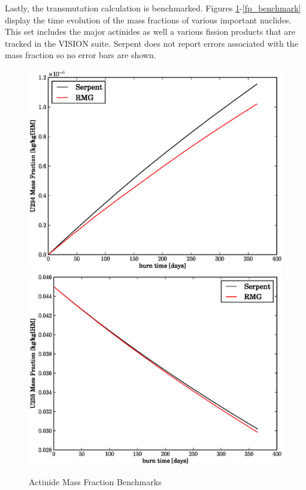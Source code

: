 Lastly, the transmutation calculation is benchmarked.
Figures \ref{act_benchmark}-\ref{fp_benchmark} display the time evolution of the mass 
fractions of various important nuclides. This set includes the major actinides 
as well a various fission products that are tracked in the VISION suite.  
Serpent does not report errors associated with the mass fraction so no error bars are shown.

\begin{figure}[htbp]
\caption{Actinide Mass Fraction Benchmarks}
\label{act_benchmark}
\begin{center}
\includegraphics[scale=0.3]{multigroup_method/figs/benchmark/U234_Mass_Fraction_.eps}
\includegraphics[scale=0.3]{multigroup_method/figs/benchmark/U235_Mass_Fraction_.eps}

\end{center}
\end{figure}
